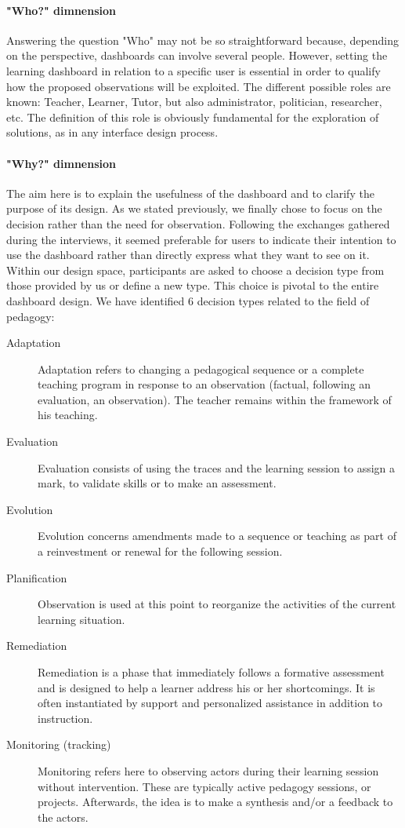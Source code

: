 \documentclass[preprint,12pt]{elsarticle}
\begin{document}
\paragraph{"Who?" dimnension}
Answering the question "Who" may not be so straightforward because, depending on the perspective, dashboards can involve several people. However, setting the learning dashboard in relation to a specific user is essential in order to qualify how the proposed observations will be exploited. The different possible roles are known: Teacher, Learner, Tutor, but also administrator, politician, researcher, etc. The definition of this role is obviously fundamental for the exploration of solutions, as in any interface design process.
\paragraph{"Why?" dimnension}
The aim here is to explain the usefulness of the dashboard and to clarify the purpose of its design. As we stated previously, we finally chose to focus on the decision rather than the need for observation. Following the exchanges gathered during the interviews, it seemed preferable for users to indicate their intention to use the dashboard rather than directly express what they want to see on it. Within our design space, participants are asked to choose a decision type from those provided by us or define a new type. This choice is pivotal to the entire dashboard design. We have identified 6 decision types related to the field of pedagogy:
\begin{description}
    \item[Adaptation] Adaptation refers to changing a pedagogical sequence or a complete teaching program in response to an observation (factual, following an evaluation, an observation). The teacher remains within the framework of his teaching.
    \item[Evaluation] Evaluation consists of using the traces and the learning session to assign a mark, to validate skills or to make an assessment.
    \item[Evolution]  Evolution concerns amendments made to a sequence or teaching as part of a reinvestment or  renewal for the following session.
    \item[Planification] Observation is used at this point to reorganize the activities of the current learning situation.
    \item[Remediation] Remediation is a phase that immediately follows a formative assessment and is designed to help a learner address his or her shortcomings. It is often instantiated by support and personalized assistance in addition to instruction.
    \item[Monitoring (tracking)] Monitoring refers here to observing actors during their learning session without intervention. These are typically active pedagogy sessions, or projects. Afterwards, the idea is to make a synthesis and/or a feedback to the actors. 
\end{description}
\end{document}
